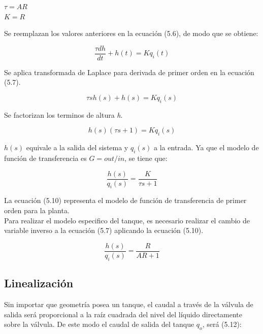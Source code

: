 \documentclass[a4paper,12pt,twoside]{proyectotanquesecci}
\begin{document}
\begin{center}
$\tau =AR$ \\
$K=R$
\end{center}

Se reemplazan los valores anteriores en la ecuación (5.6), de modo que se obtiene:

\begin{equation}
\frac {\tau dh}{dt}+h\left( t\right) =Kq_{i}\left( t\right)
\end{equation}

Se aplica transformada de Laplace para derivada de primer orden en la ecuación (5.7).

\begin{equation}
\tau sh\left( s\right) +h\left( s\right) =Kq_{i}\left( s\right)
\end{equation}

Se factorizan los terminos de altura \textit{h}.

\begin{equation}
h\left( s\right) \left( \tau s+1\right) =Kq_{i}\left( s\right)
\end{equation}

$h(s)$ equivale a la salida del sistema y $q_{i}(s)$ a la entrada. Ya que el modelo de función de transferencia es $G=out/in$, se tiene que:

\begin{equation}
\frac {h\left( s\right) }{q_{i}\left( s\right) }=\frac {K}{\tau s+1}
\end{equation}

La ecuación (5.10) representa el modelo de función de transferencia de primer orden para la planta. \\

Para realizar el modelo especifico del tanque, es necesario realizar el cambio de variable inverso a la ecuación (5.7) aplicando la ecuación (5.10).

\begin{equation}
\frac {h\left( s\right) }{q_{i}\left( s\right) }=\frac {R}{AR+1}
\end{equation}

\subsection{Linealización}

Sin importar que geometría posea un tanque, el caudal a través de la válvula de salida será proporcional a la raíz cuadrada del nivel del líquido directamente sobre la válvula. De este modo el caudal de salida del tanque $q_{o}$, será (5.12):
\end{document}
